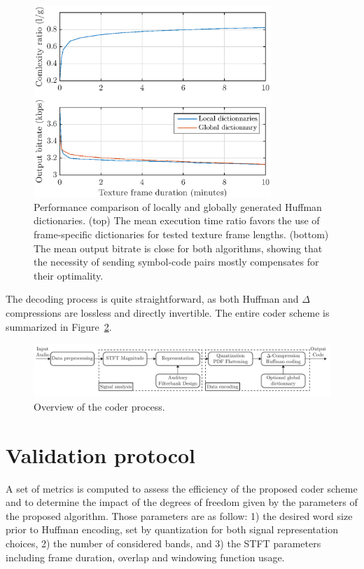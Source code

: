 \documentclass[sensors,article,submit,moreauthors,pdftex,10pt,a4paper]{mdpi}
\begin{document}
\begin{figure}[htbp]
	\centering
		\includegraphics[width=0.8\textwidth]{figures/dict_comp.eps}
	\caption{Performance comparison of locally and globally generated Huffman dictionaries. (top) The mean execution time ratio favors the use of frame-specific dictionaries for tested texture frame lengths. (bottom) The mean output bitrate is close for both algorithms, showing that the necessity of sending symbol-code pairs mostly compensates for their optimality.}
	\label{fig:dict_comp}
\end{figure}

The decoding process is quite straightforward, as both Huffman and $\Delta$ compressions are lossless and directly invertible. The entire coder scheme is summarized in Figure~\ref{fig:scheme}.

\begin{figure}[htbp]
	\centering
		\includegraphics[width=.9\textwidth]{figures/scheme.pdf}
	\caption{Overview of the coder process.}
	\label{fig:scheme}
\end{figure}

\section{Validation protocol} \label{sec:protocol}

A set of metrics is computed to assess the efficiency of the proposed coder scheme and to determine the impact of the degrees of freedom given by the parameters of the proposed algorithm. Those parameters are as follow: 1) the desired word size prior to Huffman encoding, set by quantization for both signal representation choices, 2) the number of considered bands, and 3) the STFT parameters including frame duration, overlap and windowing function usage.
\end{document}

